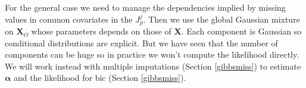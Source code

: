 \documentclass[12pt,a4paper]{report}
\begin{document}
		For the general case we need to manage the dependencies implied by missing values in common covariates in the $J_p^j$. Then we use the global Gaussian mixture on $\boldsymbol{X}_O$ whose parameters depends on those of $\boldsymbol{X}$. Each component is Gaussian so conditional distributions are explicit. But we have seen that the number of components can be huge so in practice we won't compute the likelihood directly. We will work instead with multiple imputations (Section \ref{gibbsmiss}) to estimate $\boldsymbol{\alpha}$ and the likelihood for {\sc bic} (Section \ref{gibbsmiss}).  
%		


		
\end{document}

